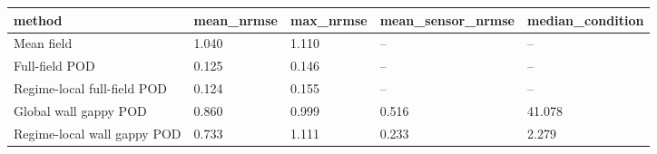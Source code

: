 \begin{tabular}{lllll}
\hline
method & mean\_nrmse & max\_nrmse & mean\_sensor\_nrmse & median\_condition \\
\hline
Mean field & 1.040 & 1.110 & -- & -- \\
Full-field POD & 0.125 & 0.146 & -- & -- \\
Regime-local full-field POD & 0.124 & 0.155 & -- & -- \\
Global wall gappy POD & 0.860 & 0.999 & 0.516 & 41.078 \\
Regime-local wall gappy POD & 0.733 & 1.111 & 0.233 & 2.279 \\
\hline
\end{tabular}
